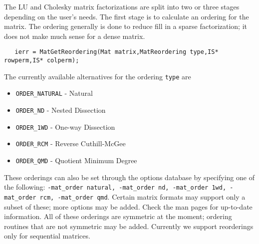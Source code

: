 The LU and Cholesky 
matrix factorizations are split into 
two or three stages depending on the user's needs. The first stage is 
to calculate an ordering for the matrix.  The ordering generally is 
done to reduce fill in a sparse factorization; it does not make much 
sense for a dense matrix.  
\begin{verbatim}
   ierr = MatGetReordering(Mat matrix,MatReordering type,IS* rowperm,IS* colperm); 
\end{verbatim}
The currently available alternatives for the ordering {\tt type} are 
\begin{itemize}
\item {\tt ORDER\_NATURAL} - Natural
\item {\tt ORDER\_ND} - Nested Dissection
\item {\tt ORDER\_1WD} - One-way Dissection
\item {\tt ORDER\_RCM} - Reverse Cuthill-McGee
\item {\tt ORDER\_QMD} - Quotient Minimum Degree
\end{itemize}
These orderings can also be set through the options database by specifying 
one of the following:  {\tt -mat\_order natural, -mat\_order nd, 
-mat\_order 1wd, -mat\_order rcm, -mat\_order qmd}.
  
  
  
 
Certain matrix formats may support only a subset of these; more options may 
be added. Check the man pages for up-to-date information. All of these orderings are 
symmetric at the moment; ordering routines that are 
not symmetric may be added. Currently we support reorderings only for 
sequential matrices.

